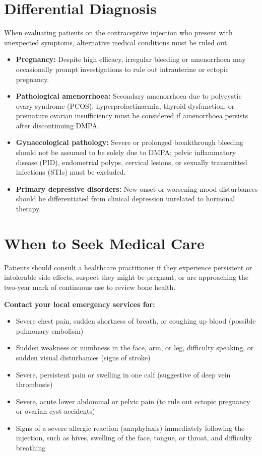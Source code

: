 \section*{Differential Diagnosis}
When evaluating patients on the contraceptive injection who present with unexpected symptoms, alternative medical conditions must be ruled out.
\begin{itemize}
    \item \textbf{Pregnancy:} Despite high efficacy, irregular bleeding or amenorrhoea may occasionally prompt investigations to rule out intrauterine or ectopic pregnancy.
    \item \textbf{Pathological amenorrhoea:} Secondary amenorrhoea due to polycystic ovary syndrome (PCOS), hyperprolactinaemia, thyroid dysfunction, or premature ovarian insufficiency must be considered if amenorrhoea persists after discontinuing DMPA.
    \item \textbf{Gynaecological pathology:} Severe or prolonged breakthrough bleeding should not be assumed to be solely due to DMPA; pelvic inflammatory disease (PID), endometrial polyps, cervical lesions, or sexually transmitted infections (STIs) must be excluded.
    \item \textbf{Primary depressive disorders:} New-onset or worsening mood disturbances should be differentiated from clinical depression unrelated to hormonal therapy.
\end{itemize}

\section*{When to Seek Medical Care}
Patients should consult a healthcare practitioner if they experience persistent or intolerable side effects, suspect they might be pregnant, or are approaching the two-year mark of continuous use to review bone health.

\textbf{Contact your local emergency services for:}
\begin{itemize}
    \item Severe chest pain, sudden shortness of breath, or coughing up blood (possible pulmonary embolism)
    \item Sudden weakness or numbness in the face, arm, or leg, difficulty speaking, or sudden visual disturbances (signs of stroke)
    \item Severe, persistent pain or swelling in one calf (suggestive of deep vein thrombosis)
    \item Severe, acute lower abdominal or pelvic pain (to rule out ectopic pregnancy or ovarian cyst accidents)
    \item Signs of a severe allergic reaction (anaphylaxis) immediately following the injection, such as hives, swelling of the face, tongue, or throat, and difficulty breathing
\end{itemize}

